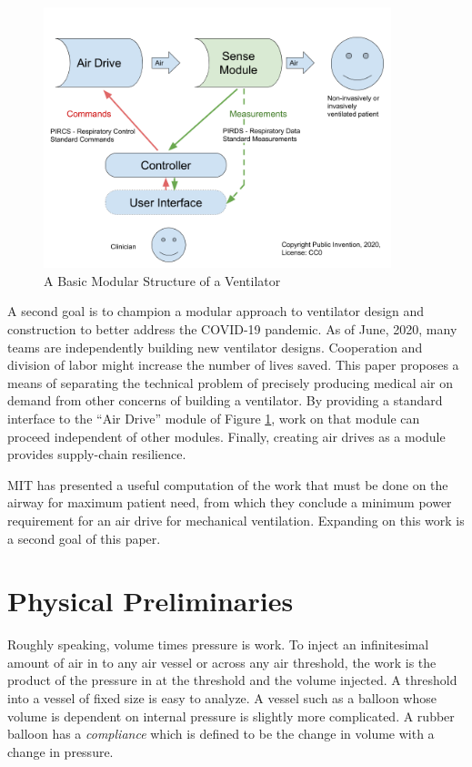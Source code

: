 \documentclass[conference]{article}
\begin{document}
\begin{figure}
\begin{center}
\includegraphics[width=0.9\textwidth]{figures/BasicModules.png}
\caption{A Basic Modular Structure of a Ventilator}
\end{center}
\label{fig:basicmodules}
\end{figure}

A second goal is to champion a modular approach to ventilator design
and construction to better address the COVID-19 pandemic. As of June, 2020,
many teams are independently building new ventilator designs. Cooperation
and division of labor might increase the number of lives saved.
This paper proposes a means of separating the technical problem of precisely
producing medical air on demand from other concerns of building a ventilator.
By providing a standard interface to the ``Air Drive'' module of Figure \ref{fig:basicmodules},
work on that module can proceed independent of other modules.
Finally, creating air drives as a module provides supply-chain resilience.


MIT has presented a useful computation of the work that must be done
on the airway for maximum patient need, from which they conclude a
minimum power requirement for an air drive for
mechanical ventilation\cite{mitpowercalculation}. Expanding on
this work is a second goal of this paper.


\section{Physical Preliminaries}

Roughly speaking, volume times pressure is work.
To inject an infinitesimal amount of air in
to any air vessel or across any air threshold,
the work is the product of the pressure in at the threshold and the
volume injected.
A threshold into a vessel of fixed size is easy to analyze.
A vessel such as a balloon whose volume is dependent on internal pressure
is slightly more complicated.
A rubber balloon has a {\em compliance} which is defined to be
the change in volume with a change in pressure.
\end{document}
